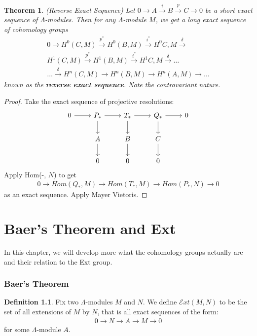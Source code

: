 \documentclass[12pt]{book}
\newtheorem{theorem}{Theorem}[chapter]
\theoremstyle{definition}
\newtheorem{definition}[theorem]{Definition}
\begin{document}
\begin{theorem}(Reverse Exact Sequence)
    Let $0 \rightarrow A \xrightarrow{i} B \xrightarrow{p} C \rightarrow 0$ be a short exact sequence of $\Lambda$-modules. Then for any $\Lambda$-module $M$, we get a long exact sequence of cohomology groups
    \begin{align*}
        0 \rightarrow H^0(C,M) \xrightarrow{p^*} H^0(B,M) \xrightarrow{i^*} H^0{C,M} \xrightarrow{\delta}\\
        H^1(C,M) \xrightarrow{p^*} H^1(B,M) \xrightarrow{i^*} H^1{C,M} \xrightarrow{\delta} \dots \\
        \dots \xrightarrow{\delta} H^n(C,M) \rightarrow H^n(B,M) \rightarrow H^n(A,M) \rightarrow \dots 
    \end{align*}
    known as the \textbf{reverse exact sequence}. Note the contravariant nature. 
\end{theorem}
\begin{proof}
    Take the exact sequence of projective resolutions: 
    \[
    \begin{tikzcd}
        0 \arrow[r] & P_* \arrow[d] \arrow[r] & T_* \arrow[r] \arrow[d] & Q_* \arrow[r] \arrow[d] & 0 \\
        & A \arrow[d] & B \arrow[d] & C \arrow[d] &\\
        & 0 & 0 & 0 & 
    \end{tikzcd}
    \]
    Apply Hom(-, $N$) to get 
    \begin{align*}
        0 \rightarrow Hom(Q_*,M) \rightarrow Hom(T_*,M) \rightarrow Hom(P_*,N) \rightarrow 0    
    \end{align*}
    as an exact sequence. 
    Apply Mayer Vietoris. 
\end{proof}

\chapter{Baer's Theorem and Ext}
In this chapter, we will develop more what the cohomology groups actually are and their relation to the Ext group. 

\subsection{Baer's Theorem}

\begin{definition}
    Fix two $\Lambda$-modules $M$ and $N$. We define $\mathcal{E}xt(M,N)$ to be the set of all extensions of $M$ by $N$, that is all exact sequences of the form: 
    \begin{align*}
        0 \rightarrow N \rightarrow A \rightarrow M \rightarrow 0
    \end{align*}
    for some $\Lambda$-module $A$. 
\end{definition}
\end{document}
